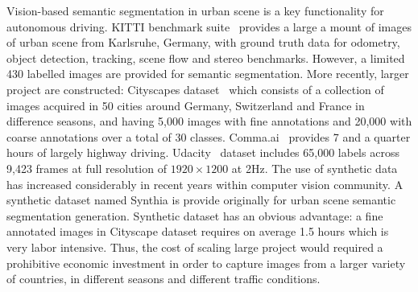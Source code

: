 \documentclass[10pt,twocolumn,letterpaper]{article}
\begin{document}
Vision-based semantic segmentation in urban scene is a key functionality for autonomous driving.
KITTI benchmark suite~\cite{Geiger2013IJRR} provides a large a mount of images of urban scene from Karlsruhe, Germany, with ground truth data for odometry, object detection, tracking, scene flow and stereo benchmarks. However, a limited 430 labelled images are provided for semantic segmentation.
More recently, larger project are constructed:
Cityscapes dataset~\cite{Cordts2016Cityscapes} which consists of a collection of images acquired in 50 cities around Germany, Switzerland and France in difference seasons, and having 5,000 images with fine annotations and 20,000 with coarse annotations over a total of 30 classes. Comma.ai~\cite{santana2016learning} provides 7 and a quarter hours of largely highway driving. Udacity~\cite{udacity} dataset includes 65,000 labels across 9,423 frames at full resolution of $1920\times1200$ at 2Hz.
The use of synthetic data has increased considerably in recent years within computer vision community. A synthetic dataset named Synthia is\cite{mueller2016benchmark} provide originally for urban scene semantic segmentation generation.
Synthetic dataset has an obvious advantage: a fine annotated images in Cityscape dataset requires on average 1.5 hours which is very labor intensive. Thus, the cost of scaling large project would required a prohibitive economic investment in order to capture images from a larger variety of countries, in different seasons and different traffic conditions. 
\end{document}
